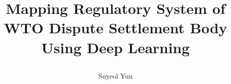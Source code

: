 \documentclass[12pt,letterpaper]{article}
\newcommand{\tit}{
\bf 
Mapping Regulatory System of WTO Dispute Settlement Body Using Deep Learning
}
\newcommand\spacingset[1]{\renewcommand{\baselinestretch}
{#1}\small\normalsize}
\begin{document}
\spacingset{1.25}

\setcounter{page}{0}
\vspace{-.1in}

{\title{
    \tit
  }
  \author{Suyeol Yun
  }
  \maketitle
}

\thispagestyle{empty}
\vspace{-.1in}

\begin{abstract}
\end{abstract}

\spacingset{1.5} %

% 


% 
% 
% 
% 
% 
% 
% 
% 

% 

% 

% 
\end{document}
